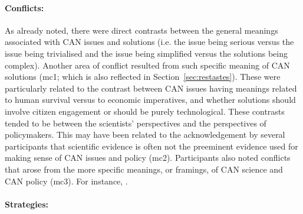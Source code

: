 \paragraph{Conflicts:}
As already noted, there were direct contrasts between the general meanings associated with CAN issues and solutions (i.e. the issue being serious versus the issue being trivialised and the issue being simplified versus the solutions being complex). Another area of conflict resulted from such specific meaning of CAN solutions (mc1; which is also reflected in Section~\ref{sec:restastes}). These were particularly related to the contrast between CAN issues having meanings related to human survival versus to economic imperatives, and whether solutions should involve citizen engagement or should be purely technological. These contrasts tended to be between the scientists' perspectives and the perspectives of policymakers. This may have been related to the acknowledgement by several participants that scientific evidence is often not the preeminent evidence used for making sense of CAN issues and policy (mc2). Participants also noted conflicts that arose from the more specific meanings, or framings, of CAN science and CAN policy (mc3). For instance, . 


\paragraph{Strategies:}


